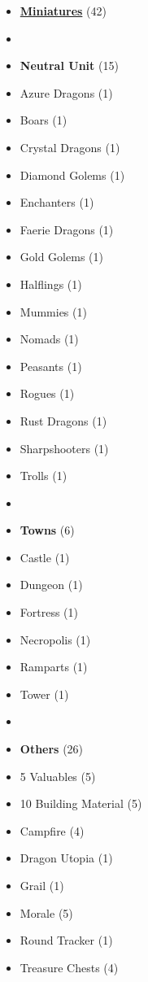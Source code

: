 
\begin{multicols*}{2}

\footnotesize

\begin{itemize}[leftmargin=0pt, label={}, noitemsep]
  \item \textbf{\small{\underline{Miniatures}}} (42)
  \item
  \item \textbf{Neutral Unit} (15)
  \item Azure Dragons (1)
  \item Boars (1)
  \item Crystal Dragons (1)
  \item Diamond Golems (1)
  \item Enchanters (1)
  \item Faerie Dragons (1)
  \item Gold Golems (1)
  \item Halflings (1)
  \item Mummies (1)
  \item Nomads (1)
  \item Peasants (1)
  \item Rogues (1)
  \item Rust Dragons (1)
  \item Sharpshooters (1)
  \item Trolls (1)
  \item
  \item \textbf{Towns} (6)
  \item Castle (1)
  \item Dungeon (1)
  \item Fortress (1)
  \item Necropolis (1)
  \item Ramparts (1)
  \item Tower (1)
  \item
  \item \textbf{Others} (26)
  \item 5 Valuables (5)
  \item 10 Building Material (5)
  \item Campfire (4)
  \item Dragon Utopia (1)
  \item Grail (1)
  \item Morale (5)
  \item Round Tracker (1)
  \item Treasure Chests (4)

\end{itemize}
\end{multicols*}
